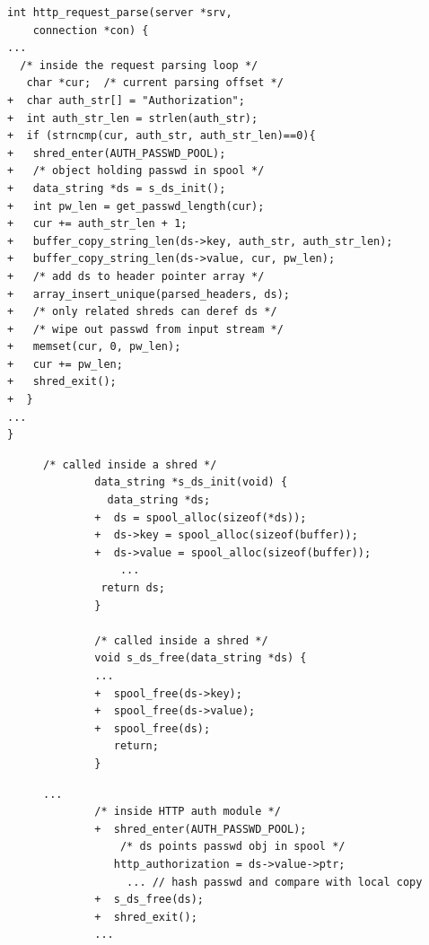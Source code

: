 \begin{lstlisting}[caption={{\tt lighttpd/src/request.c} -- The HTTP request parser specially handles the AUTH request inside a shred: it allocates a {\tt data\_string} object in the s-pool (Line 11), copies the input password from the network stream to the object (Line 12-15), saves the object pointer to the array of parsed headers (Line 17), and finally erases the password from the input buffer before exiting the shred. }, label=list:request]
int http_request_parse(server *srv, 
    connection *con) {
...
  /* inside the request parsing loop */   
   char *cur;  /* current parsing offset */    
+  char auth_str[] = "Authorization";
+  int auth_str_len = strlen(auth_str); 
+  if (strncmp(cur, auth_str, auth_str_len)==0){
+   shred_enter(AUTH_PASSWD_POOL);
+   /* object holding passwd in spool */
+   data_string *ds = s_ds_init(); 
+   int pw_len = get_passwd_length(cur);
+   cur += auth_str_len + 1;
+   buffer_copy_string_len(ds->key, auth_str, auth_str_len);
+   buffer_copy_string_len(ds->value, cur, pw_len);
+   /* add ds to header pointer array */
+   array_insert_unique(parsed_headers, ds);
+   /* only related shreds can deref ds */
+   /* wipe out passwd from input stream */
+   memset(cur, 0, pw_len); 
+   cur += pw_len; 
+   shred_exit();
+  }
...
}
\end{lstlisting}


\begin{figure}[h]
	\centering
	\begin{minipage}[b]{0.45\textwidth}
		\centering	
		\begin{lstlisting}[caption={{\tt lighttpd/src/data\_string.c} -- We added s-pool support to the {\tt data\_string} type in Lighttpd, which allows the HTTP parser to save the AUTH password, among other things, in s-pools and erase them when needed.}, label=list:ds]
		/* called inside a shred */
		data_string *s_ds_init(void) {
 		  data_string *ds;
		+  ds = spool_alloc(sizeof(*ds));
		+  ds->key = spool_alloc(sizeof(buffer));
		+  ds->value = spool_alloc(sizeof(buffer));
			...
	  	 return ds;
		}

		/* called inside a shred */
		void s_ds_free(data_string *ds) {
		...
		+  spool_free(ds->key);
		+  spool_free(ds->value);
		+  spool_free(ds);
		   return;
		}
		\end{lstlisting}
	\end{minipage}
 \hfill
	\begin{minipage}[b]{0.45\textwidth}
		\centering	
		\begin{lstlisting}[caption={{\tt lighttpd/src/mod\_auth.c} -- When the authentication module receives the parsed headers, it enters a shred, associated to the same s-pool as the parser shred. It retrieves the password by dereferencing {\tt ds}, as if the password resided in a regular memory region (Line 5)}, label=list:auth]
		...
		/* inside HTTP auth module */
		+  shred_enter(AUTH_PASSWD_POOL);
	    	/* ds points passwd obj in spool */
		   http_authorization = ds->value->ptr;
  			 ... // hash passwd and compare with local copy 
		+  s_ds_free(ds);
		+  shred_exit();
		...
	\end{lstlisting}
	\end{minipage}
\end{figure}


